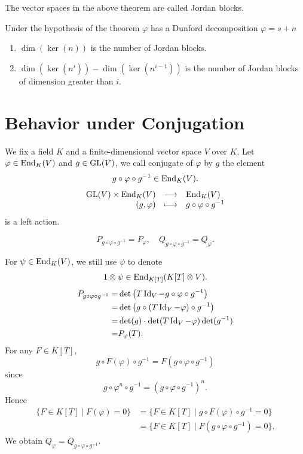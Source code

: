 \begin{definitionenv}
    The vector spaces in the above theorem are called Jordan blocks.
\end{definitionenv}

\begin{remark}
    Under the hypothesis of the theorem $\varphi$ has a Dunford decomposition $\varphi = s + n$
    \begin{enumerate}[label = (\arabic*)]
        \item $\dim(\ker(n))$ is the number of Jordan blocks.
        \item $\dim(\ker(n^i)) - \dim(\ker(n^{i-1}))$ is the number of Jordan blocks of dimension greater than $i$.
    \end{enumerate}
\end{remark}


\section{Behavior under Conjugation}


We fix a field $K$ and a finite-dimensional vector space $V$ over $K$.
Let $\varphi \in \operatorname{\mathrm{End}}_{K}(V)$ and $g \in \operatorname{\mathrm{GL}}(V)$, we call conjugate of $\varphi$ by $g$ the element
$$g \circ \varphi \circ g^{-1} \in \operatorname{\mathrm{End}}_{K}(V).$$
$$\begin{array}{rcl}
    \operatorname{\mathrm{GL}}(V) \times \operatorname{\mathrm{End}}_{K}(V) & \longrightarrow & \operatorname{\mathrm{End}}_{K}(V)\\
    (g,\varphi) & \longmapsto & g \circ \varphi \circ g^{-1}
\end{array}$$
is a left action.

\begin{theoremenv}
    $$P_{g \circ \varphi \circ g^{-1}} = P_{\varphi}, \quad Q_{g \circ \varphi \circ g^{-1}} = Q_{\varphi}.$$
\end{theoremenv}
\begin{proofenv}
    For $\psi \in \operatorname{\mathrm{End}}_{K}(V)$, we still use $\psi$ to denote
    $$1 \otimes \psi \in \operatorname{\mathrm{End}}_{K[T]}(K[T]\otimes V).$$
    $$\begin{aligned}
        P_{g \circ \varphi \circ g^{-1}} = & \det \left(T \operatorname{\mathrm{Id}}_{V} - g \circ \varphi \circ g^{-1}\right)\\
        = & \det\left(g \circ (T \operatorname{\mathrm{Id}}_{V} - \varphi) \circ g^{-1}\right)\\
        = & \det(g) \cdot \det(T \operatorname{\mathrm{Id}}_{V} - \varphi) \det(g^{-1})\\
        = & P_{\varphi} (T).
    \end{aligned}$$
    For any $F \in K[T]$,
    $$g \circ F(\varphi) \circ g^{-1} = F(g \circ \varphi \circ g^{-1})$$
    since 
    $$g \circ \varphi^n \circ g^{-1} = (g \circ \varphi \circ g^{-1})^n.$$
    Hence
    $$\begin{aligned}
        \{F \in K[T] \mid F(\varphi) = 0\} & = \{F \in K[T] \mid g \circ F(\varphi) \circ g^{-1} = 0\}\\
        & = \{F \in K[T] \mid F(g \circ \varphi \circ g^{-1}) = 0\}.
    \end{aligned}$$
    We obtain $Q_{\varphi} = Q_{g \circ \varphi \circ g^{-1}}$.
\end{proofenv}

